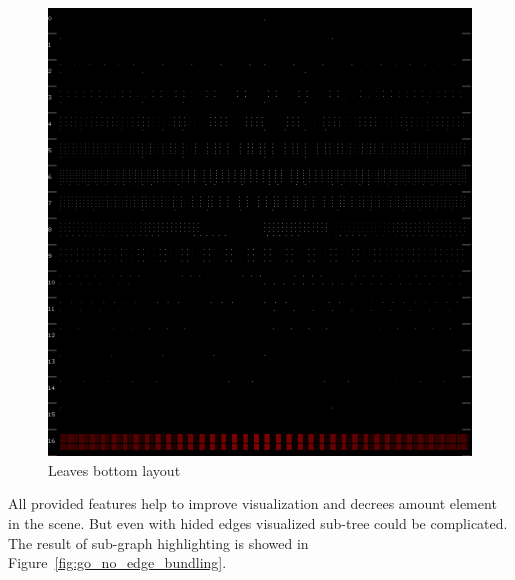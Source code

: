 \begin{figure}[h!]
\centering
\includegraphics[scale=0.3]{pictures/go_leaves_bottom_layout.png}
\caption{Leaves bottom layout}
\label{fig:go_leaves_bottom_layout}
\end{figure}

All provided features help to improve visualization and decrees amount element in the scene. But even with hided edges visualized sub-tree could be complicated. The result of sub-graph highlighting is showed in Figure~\ref{fig:go_no_edge_bundling}.

